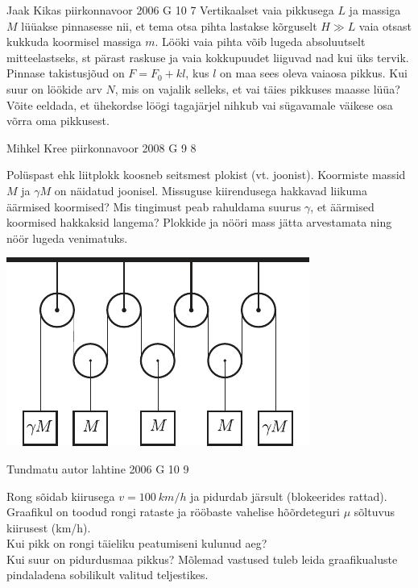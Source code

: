 \documentclass[11pt, twoside]{article}
\begin{document}
{%
{Jaak Kikas} %
{piirkonnavoor} %
{2006} %
{G 10} %
{7} %
{
\ifStatement
Vertikaalset vaia pikkusega $L$ ja massiga $M$ lüüakse pinnasesse nii, et tema otsa pihta lastakse kõrguselt $H\gg L$ vaia otsast kukkuda koormisel massiga $m$. Lööki vaia pihta võib lugeda absoluutselt mitteelastseks, st pärast raskuse ja vaia kokkupuudet liiguvad nad kui üks tervik. Pinnase takistusjõud on $F = F_0 + kl$, kus $l$ on maa sees oleva vaiaosa pikkus. Kui suur on löökide arv $N$, mis on vajalik selleks, et vai täies pikkuses maasse lüüa? Võite eeldada, et ühekordse löögi tagajärjel nihkub vai sügavamale väikese osa võrra oma pikkusest.
\fi
}

{Mihkel Kree} %
{piirkonnavoor} %
{2008} %
{G 9} %
{8} %
{
\ifStatement
Polüspast ehk liitplokk koosneb seitsmest plokist (vt. joonist). Koormiste massid $M$ ja $\gamma M$ on näidatud joonisel. Missuguse kiirendusega hakkavad liikuma äärmised koormised? Mis tingimust peab rahuldama suurus $\gamma$, et äärmised koormised hakkaksid langema? Plokkide ja nööri mass jätta arvestamata ning nöör lugeda venimatuks. 

\begin{center}
	\includegraphics[width=0.6\linewidth]{2008-v2g-09-yl}
\end{center}
\fi
}

{Tundmatu autor} %
{lahtine} %
{2006} %
{G 10} %
{9} %
{
\ifStatement
Rong sõidab kiirusega $v = \SI{100}{km/h}$ ja pidurdab järsult (blokeerides rattad). Graafikul on toodud rongi rataste ja rööbaste vahelise hõõrdeteguri $\mu$ sõltuvus kiirusest (\si{km/h}).\\
\osa Kui pikk on rongi täieliku peatumiseni kulunud aeg?\\
\osa Kui suur on pidurdusmaa pikkus? Mõlemad vastused tuleb leida
graafikualuste pindaladena sobilikult valitud teljestikes.

}}
\end{document}
